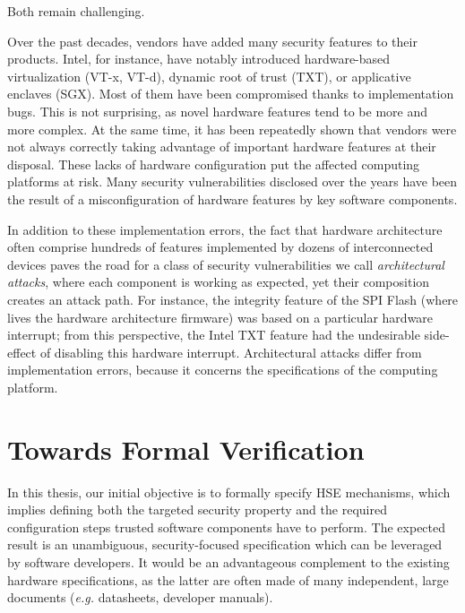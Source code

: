 Both remain challenging.

Over the past decades, vendors have added many security features to their
products.
%
Intel, for instance, have notably introduced hardware-based virtualization
(VT-x, VT-d), dynamic root of trust (TXT), or applicative enclaves (SGX).
%
Most of them have been compromised thanks to implementation bugs.
%
This is not surprising, as novel hardware features tend to be more and more
complex.
%
At the same time, it has been repeatedly shown that vendors were not always
correctly taking advantage of important hardware features at their disposal.
%
These lacks of hardware configuration put the affected computing platforms at
risk.
%
Many security vulnerabilities disclosed over the years have been the result of a
misconfiguration of hardware features by key software components.

In addition to these implementation errors, the fact that hardware architecture
often comprise hundreds of features implemented by dozens of interconnected
devices paves the road for a class of security vulnerabilities we call
\emph{architectural attacks}, where each component is working as expected, yet
their composition creates an attack path.
%
For instance, the integrity feature of the SPI Flash (where lives the hardware
architecture firmware) was based on a particular hardware interrupt; from this
perspective, the Intel TXT feature had the undesirable side-effect of disabling
this hardware interrupt.
%
Architectural attacks differ from implementation errors, because it concerns the
specifications of the computing platform.

\section{Towards Formal Verification}

In this thesis, our initial objective is to formally specify HSE mechanisms,
which implies defining both the targeted security property and the required
configuration steps trusted software components have to perform.
%
The expected result is an unambiguous, security-focused specification which can
be leveraged by software developers.
%
It would be an advantageous complement to the existing hardware specifications,
as the latter are often made of many independent, large documents (\emph{e.g.}
datasheets, developer manuals).

